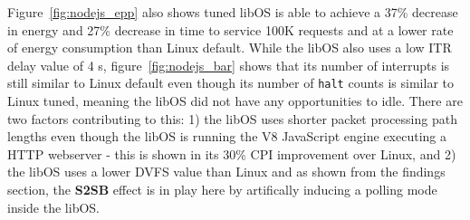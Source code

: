 Figure~\ref{fig:nodejs_epp} also shows tuned libOS is able to achieve a 37\% decrease in energy and 27\% decrease in time to service 100K requests and at a lower rate of energy consumption than Linux default. While the libOS also uses a low ITR delay value of 4 \micro s, figure~\ref{fig:nodejs_bar} shows that its number of interrupts is still similar to Linux default even though its number of \texttt{halt} counts is similar to Linux tuned, meaning the libOS did not have any opportunities to idle. There are two factors contributing to this: 1) the libOS uses shorter packet processing path lengths even though the libOS is running the V8 JavaScript engine executing a HTTP webserver - this is shown in its 30\% CPI improvement over Linux, and 2) the libOS uses a lower DVFS value than Linux and as shown from the findings section, the \textbf{S2SB} effect is in play here by artifically inducing a polling mode inside the libOS.







